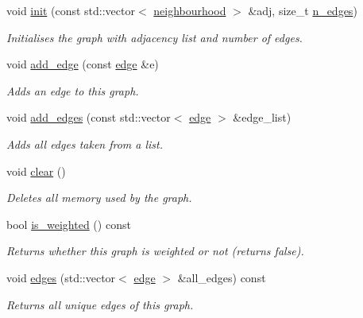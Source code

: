 \begin{DoxyCompactItemize}
void \hyperlink{classlgraph_1_1uxgraph_ab0e84975aa8048e6d93622d1b4e0c567}{init} (const std\+::vector$<$ \hyperlink{namespacelgraph_a052e7766c13f3a43cec0aec8173fdede}{neighbourhood} $>$ \&adj, size\+\_\+t \hyperlink{classlgraph_1_1xxgraph_af00bce8b07a42754601d1e3bebe2c1fa}{n\+\_\+edges})
\begin{DoxyCompactList}\small\item\em Initialises the graph with adjacency list and number of edges. \end{DoxyCompactList}\item 
void \hyperlink{classlgraph_1_1uxgraph_a1a826ff50563bc4021e16d712f309232}{add\+\_\+edge} (const \hyperlink{namespacelgraph_a76bd7d50719f03de7a85db259d80d572}{edge} \&e)
\begin{DoxyCompactList}\small\item\em Adds an edge to this graph. \end{DoxyCompactList}\item 
void \hyperlink{classlgraph_1_1uxgraph_ad20f841d6bb1147d087546c6054c55f3}{add\+\_\+edges} (const std\+::vector$<$ \hyperlink{namespacelgraph_a76bd7d50719f03de7a85db259d80d572}{edge} $>$ \&edge\+\_\+list)
\begin{DoxyCompactList}\small\item\em Adds all edges taken from a list. \end{DoxyCompactList}\item 
void \hyperlink{classlgraph_1_1uxgraph_aad397c98fd1f144350e4418971319a97}{clear} ()
\begin{DoxyCompactList}\small\item\em Deletes all memory used by the graph. \end{DoxyCompactList}\item 
\mbox{\label{classlgraph_1_1uxgraph_a8fab8e739e0e74852a1c6de18b2fe6aa}} 
bool \hyperlink{classlgraph_1_1uxgraph_a8fab8e739e0e74852a1c6de18b2fe6aa}{is\+\_\+weighted} () const
\begin{DoxyCompactList}\small\item\em Returns whether this graph is weighted or not (returns false). \end{DoxyCompactList}\item 
void \hyperlink{classlgraph_1_1uxgraph_abf4c5ce2b595780e6ba80f06bdd0be16}{edges} (std\+::vector$<$ \hyperlink{namespacelgraph_a76bd7d50719f03de7a85db259d80d572}{edge} $>$ \&all\+\_\+edges) const
\begin{DoxyCompactList}\small\item\em Returns all unique edges of this graph. \end{DoxyCompactList}\item 

\end{DoxyCompactItemize}
